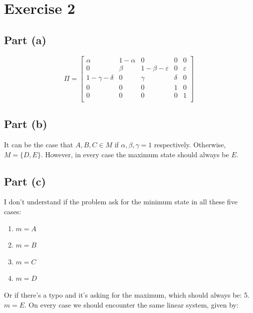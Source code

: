 \section{Exercise 2}

\subsection*{Part (a)}

\begin{figure}[H]
    \centering
    
\end{figure}

\[ \Pi = \left[ \begin{array}{ccccc}
    \alpha & 1-\alpha & 0 & 0 & 0\\
    0 & \beta & 1-\beta-\varepsilon & 0 & \varepsilon\\
    1-\gamma-\delta & 0 & \gamma & \delta & 0\\
    0 & 0 & 0 & 1 & 0\\
    0 & 0 & 0 & 0 & 1\\
\end{array} \right] \]


\subsection*{Part (b)}

It can be the case that $A,B,C \in M$ if $\alpha,\beta,\gamma = 1$ respectively. Otherwise, $M = \{D,E\}$. However, in every case the maximum state should always be $E$.

\subsection*{Part (c)}

I don't understand if the problem ask for the minimum state in all these five cases:
\begin{multicols}{2}
    \begin{enumerate}
        \item $m = A$
        \item $m = B$
        \item $m = C$
        \item $m = D$
    \end{enumerate}
\end{multicols}

Or if there's a typo and it's asking for the maximum, which should always be: 5. $m = E$. On every case we should encounter the same linear system, given by:


